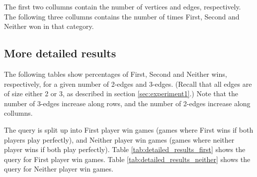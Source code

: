 The first two collumns contain the number of vertices and edges, respectively. The following three collumns contains the number of times First, Second and Neither won in that category.

\subsection{More detailed results}

The following tables show percentages of First, Second and Neither wins, respectively, for a given number of 2-edges and 3-edges.
(Recall that all edges are of size either 2 or 3, as described in section \ref{sec:experiment1}.)
Note that the number of 3-edges increase along rows, and the number of 2-edges increase along collumns.

The query is split up into First player win games (games where First wins if both players play perfectly), and Neither player win games (games where neither player wins if both play perfectly).
Table \ref{tab:detailed_results_first} shows the query for First player win games. Table \ref{tab:detailed_results_neither} shows the query for Neither player win games.

